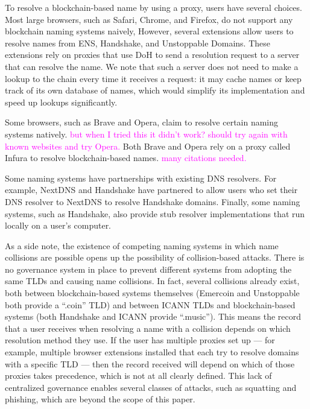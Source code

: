 \documentclass[10pt,sigconf,letterpaper]{acmart}
\newcommand{\randall}{\ding{110}\ding{43}\textcolor{magenta}}
\newcommand{\randall}{}
\begin{document}
To resolve a blockchain-based name by using a proxy, users have several choices. Most large 
browsers, such as Safari, Chrome, and Firefox, do not support any blockchain 
naming systems naively, However, several extensions allow users to resolve names from ENS, 
Handshake, and Unstoppable Domains. These extensions rely on proxies that use 
DoH to send a resolution request to a server that can resolve the name. We 
note that such a server does not need to make a lookup to the chain every time 
it receives a request: it may cache names or keep track of its own database of 
names, which would simplify its implementation and speed up lookups 
significantly. 

Some browsers, such as Brave and Opera, claim to resolve certain naming systems 
natively. \randall{but when I tried this it didn't work? should try again with 
known websites and try Opera.} Both Brave and Opera rely on a proxy called 
Infura to resolve blockchain-based names. \randall{many citations needed.} 

Some naming systems have partnerships with existing DNS resolvers. For example, 
NextDNS and Handshake have partnered to allow users who set their DNS resolver 
to NextDNS to resolve Handshake domains. Finally, some naming systems, such as 
Handshake, also provide stub resolver implementations that run locally on a 
user's computer. 

As a side note, the existence of competing naming systems in which name 
collisions are possible 
opens up the possibility of collision-based attacks. There is no governance 
system in place to prevent different systems from adopting the same TLDs and 
causing name collisions. In fact, several collisions already exist, both 
between blockchain-based systems themselves (Emercoin and Unstoppable both 
provide a ``.coin'' TLD) and between ICANN TLDs and blockchain-based systems 
(both Handshake and ICANN provide ``.music''). 
This means the record that a user receives when resolving a name with a 
collision depends on which resolution method they use. If the user has multiple 
proxies set up --- for example, multiple browser extensions installed that each 
try to resolve domains with a specific TLD --- then the record received will 
depend on which of those proxies takes precedence, which is not at all clearly 
defined. This lack of centralized governance enables several classes of attacks, such as squatting 
and phishing, which are beyond the scope of this paper.
\end{document}
